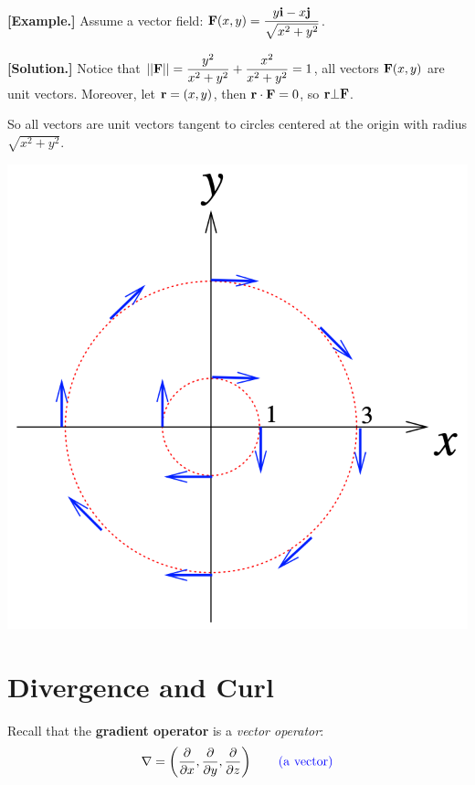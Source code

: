 \documentclass[11pt, a4paper]{MATH2023}
\newcommand{\eg}{\textbf{[Example.] }}
\newcommand{\sol}{\textbf{[Solution.] }}
\newcommand{\ii}{{\bf i}}
\newcommand{\jj}{{\bf j}}
\newcommand{\pt}{\partial}
\begin{document}
\begin{spacing}{1.3}
    \eg Assume a vector field: ${\bf F}(x,y)=\dfrac{y\ii -x\jj}{\sqrt{x^2+y^2}}$.

    \sol Notice that $||{\bf F}||=\dfrac{y^2}{x^2+y^2}+\dfrac{x^2}{x^2+y^2}=1$, all vectors 
    ${\bf F}(x,y)$ are unit vectors. Moreover, let ${\bf r}=(x,y)$, then ${\bf r}\cdot {\bf F}=0$,
    so ${\bf r}\bot {\bf F}$.

    So all vectors are unit vectors tangent to circles centered at the origin with radius $\sqrt{x^2+y^2}$.
    \begin{center}
        \includegraphics[scale=0.4]{images/Ch15-ex1.2.png}
    \end{center}

    \newpage
    \section{Divergence and Curl}

    Recall that the {\bf gradient operator} is a {\it vector operator}:
    $$\nabla =\left(\frac{\pt}{\pt x}, \frac{\pt}{\pt y}, \frac{\pt}{\pt z}\right)\qquad {\blue \rm (a\ vector)}$$


\end{spacing}
\end{document}
